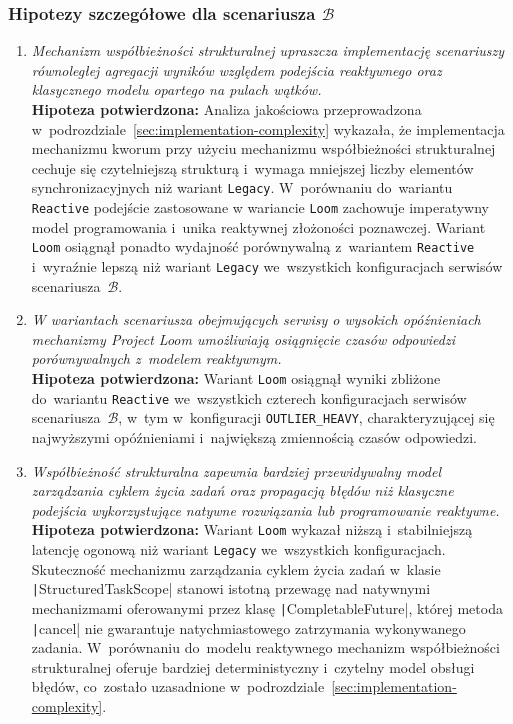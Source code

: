 \subsubsection{Hipotezy szczegółowe dla scenariusza \ensuremath{\mathcal{B}}}
\begin{enumerate}[label=\textbf{H\arabic*.}, start=5]
    \itemsep0em

    \item \textit{Mechanizm współbieżności strukturalnej upraszcza implementację scenariuszy równoległej agregacji wyników względem podejścia reaktywnego oraz klasycznego modelu opartego na pulach wątków.} \\[0.5em] \textbf{Hipoteza potwierdzona:} Analiza jakościowa przeprowadzona w~podrozdziale~\ref{sec:implementation-complexity} wykazała, że implementacja mechanizmu kworum przy użyciu mechanizmu współbieżności strukturalnej cechuje się czytelniejszą strukturą i~wymaga mniejszej liczby elementów synchronizacyjnych niż wariant \texttt{Legacy}. W~porównaniu do~wariantu \texttt{Reactive} podejście zastosowane w wariancie \texttt{Loom} zachowuje imperatywny model programowania i~unika reaktywnej złożoności poznawczej. Wariant \texttt{Loom} osiągnął ponadto wydajność porównywalną z~wariantem \texttt{Reactive} i~wyraźnie lepszą niż wariant \texttt{Legacy} we~wszystkich konfiguracjach serwisów scenariusza~$\mathcal{B}$.

    \item \textit{W wariantach scenariusza obejmujących serwisy o wysokich opóźnieniach mechanizmy Project Loom umożliwiają osiągnięcie czasów odpowiedzi porównywalnych z~modelem reaktywnym.} \\[0.5em] \textbf{Hipoteza potwierdzona:} Wariant \texttt{Loom} osiągnął wyniki zbliżone do~wariantu \texttt{Reactive} we~wszystkich czterech konfiguracjach serwisów scenariusza~$\mathcal{B}$, w~tym w~konfiguracji \texttt{OUTLIER\_HEAVY}, charakteryzującej się najwyższymi opóźnieniami i~największą zmiennością czasów odpowiedzi.

    \item \textit{Współbieżność strukturalna zapewnia bardziej przewidywalny model zarządzania cyklem życia zadań oraz propagacją błędów niż klasyczne podejścia wykorzystujące natywne rozwiązania lub programowanie reaktywne.} \\[0.5em] \textbf{Hipoteza potwierdzona:} Wariant \texttt{Loom} wykazał niższą i~stabilniejszą latencję ogonową niż wariant \texttt{Legacy} we~wszystkich konfiguracjach. Skuteczność mechanizmu zarządzania cyklem życia zadań w~klasie \texttt|StructuredTaskScope| stanowi istotną przewagę nad natywnymi mechanizmami oferowanymi przez klasę \texttt|CompletableFuture|, której metoda \texttt|cancel| nie gwarantuje natychmiastowego zatrzymania wykonywanego zadania. W~porównaniu do~modelu reaktywnego mechanizm współbieżności strukturalnej oferuje bardziej deterministyczny i~czytelny model obsługi błędów, co~zostało uzasadnione w~podrozdziale~\ref{sec:implementation-complexity}.
    
\end{enumerate}
    
